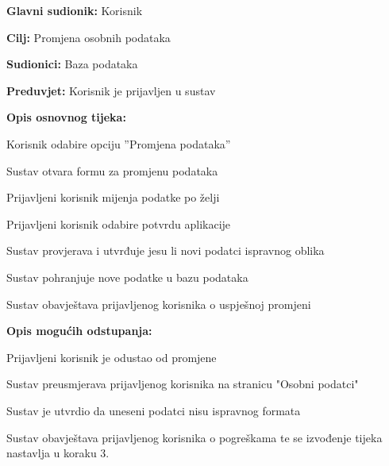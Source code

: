 					\noindent {}
					\begin{packed_item}
	
						\item \textbf{Glavni sudionik: }Korisnik
						\item  \textbf{Cilj:} Promjena osobnih podataka
						\item  \textbf{Sudionici:} Baza podataka
						\item  \textbf{Preduvjet:} Korisnik je prijavljen u sustav
						\item  \textbf{Opis osnovnog tijeka:}
						
						\item[] \begin{packed_enum}
	
							\item Korisnik odabire opciju ”Promjena podataka”
       					\item Sustav otvara formu za promjenu podataka
                            \item Prijavljeni korisnik mijenja podatke po želji
                            \item Prijavljeni korisnik odabire potvrdu aplikacije
                            \item Sustav provjerava i utvrđuje jesu li novi podatci ispravnog oblika
                            \item Sustav pohranjuje nove podatke u bazu podataka
                            \item Sustav obavještava prijavljenog korisnika o uspješnoj promjeni                           
                            \end{packed_enum}
						
	                \item  \textbf{Opis mogućih odstupanja:}
                    \item[] \begin{packed_item}
							\item[4.a] Prijavljeni korisnik je odustao od promjene
							\item[] \begin{packed_enum}
								
								\item Sustav preusmjerava prijavljenog korisnika na stranicu "Osobni podatci"				
							\end{packed_enum}
                            \item[5.a] Sustav je utvrdio da uneseni podatci nisu ispravnog formata
							\item[] \begin{packed_enum}
								
								\item Sustav obavještava prijavljenog korisnika o pogreškama te se izvođenje tijeka nastavlja u koraku 3.					
							\end{packed_enum}
                        \end{packed_item}
                    \end{packed_item}

